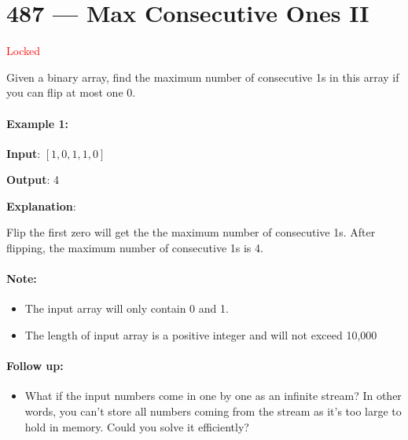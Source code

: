 \section{487 --- Max Consecutive Ones II}
\textcolor{red}{\large Locked}

Given a binary array, find the maximum number of consecutive 1s in this array if you can flip at most one 0.

\paragraph{Example 1:}

\begin{flushleft}
\textbf{Input}: $[1,0,1,1,0]$

\textbf{Output}: 4

\textbf{Explanation}: 

Flip the first zero will get the the maximum number of consecutive 1s. After flipping, the maximum number of consecutive 1s is 4.
\end{flushleft}
 

\paragraph{Note:}

\begin{itemize}
\item The input array will only contain 0 and 1.
\item The length of input array is a positive integer and will not exceed 10,000
\end{itemize} 

\paragraph{Follow up:}
\begin{itemize}
\item What if the input numbers come in one by one as an infinite stream? In other words, you can't store all numbers coming from the stream as it's too large to hold in memory. Could you solve it efficiently?
\end{itemize}


